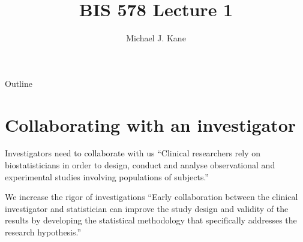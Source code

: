 \documentclass[13pt]{beamer}
\title{BIS 578 Lecture 1}
\author{Michael J. Kane}
\date{}
\newcommand{\proglang}[1]{\textsf{#1}}
\newenvironment{reference}[2]{
  \begin{textblock*}{\textwidth}(#1,#2)
    \footnotesize\it\bgroup\color{black!50!black}}{\egroup\end{textblock*}}
\begin{document}
\begin{frame}
  \titlepage
\end{frame}

\begin{frame}{Outline}
  \tableofcontents
\end{frame}




\section{Collaborating with an investigator}

\begin{frame}{Investigators need to collaborate with us}
``Clinical researchers rely on biostatisticians in order to design, conduct and 
analyse observational and experimental studies involving populations of 
subjects.'' \citep{Bangdiwala2001}
\end{frame}

\begin{frame}{We increase the rigor of investigations}
``Early collaboration between the clinical investigator and statistician can 
improve the study design and validity of the results by developing the 
statistical methodology that specifically addresses the research hypothesis.''
\cite{Adams2009}
\end{frame}
\end{document}
